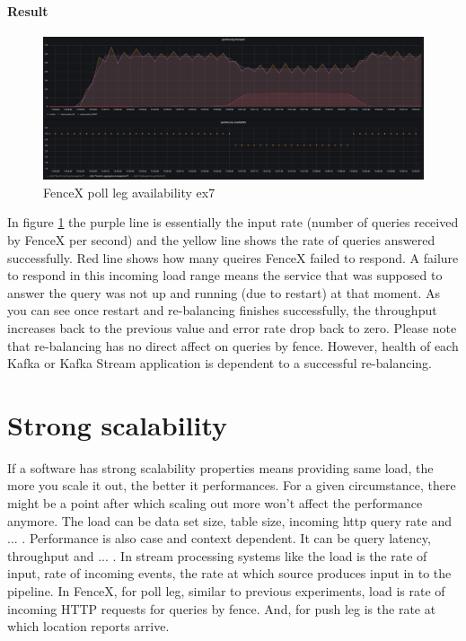 \documentclass[a4]{report}
\begin{document}
    \paragraph{Result}
    \begin{figure}[ht]
        \caption{FenceX poll leg availability ex7}
        \label{fig:ex7}
        \includegraphics[scale=0.4]{images/evaluation/ex7-benchmarking-ongoing-2per10sec.png}
    \end{figure}

    In figure \ref{fig:ex7} the purple line is essentially the input rate (number of queries received by FenceX per
    second) and the yellow line shows the rate of queries answered successfully.
    Red line shows how many queires FenceX failed to respond.
    A failure to respond in this incoming load range means the service that was supposed to answer the query was not
    up and running (due to restart) at that moment.
    As you can see once restart and re-balancing finishes successfully, the throughput increases back to the previous
    value and error rate drop back to zero.
    Please note that re-balancing has no direct affect on queries by fence.
    However, health of each Kafka or Kafka Stream application is dependent to a successful re-balancing.


    \section{Strong scalability}
    If a software has strong scalability properties means providing same load, the more you scale it out, the better
    it performances.
    For a given circumstance, there might be a point after which scaling out more won't affect the performance anymore.
    The load can be data set size, table size, incoming http query rate and ... .
    Performance is also case and context dependent.
    It can be query latency, throughput and ... .
    In stream processing systems like the load is the rate of input, rate of incoming events, the rate at
    which source produces input in to the pipeline.
    In FenceX, for poll leg, similar to previous experiments, load is rate of incoming HTTP requests for queries by
    fence.
    And, for push leg is the rate at which location reports arrive.
\end{document}
